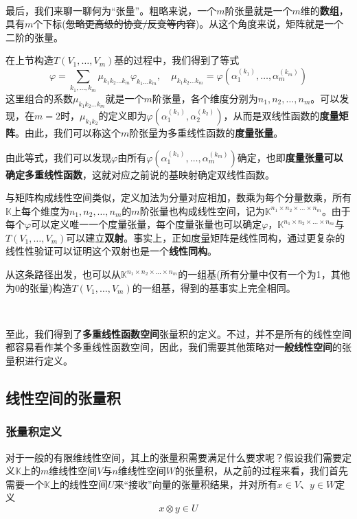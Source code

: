 \documentclass[a4paper,UTF8,fontset=windows,AutoFakeBold]{ctexart}
\newcommand*{\note}{\noindent *}
\begin{document}
\

最后，我们来聊一聊何为``张量''。粗略来说，一个$m$阶张量就是一个$m$维的\textbf{数组}，具有$m$个下标(\sout{忽略更高级的协变/反变等内容})。从这个角度来说，矩阵就是一个二阶的张量。

在上节构造$T(V_1,\dots,V_m)$基的过程中，我们得到了等式
$$\varphi=\sum_{k_1,\dots,k_m}\mu_{k_1k_2\dots k_m}\varphi_{k_1\dots k_m},\quad\mu_{k_1k_2\dots k_m}=\varphi(\alpha_1^{(k_1)},\dots,\alpha_m^{(k_m)})$$
这里组合的系数$\mu_{k_1k_2\dots k_m}$就是一个$m$阶张量，各个维度分别为$n_1,n_2,\dots,n_m$。可以发现，在$m=2$时，$\mu_{k_1k_2}$的定义即为$\varphi(\alpha_1^{(k_1)},\alpha_2^{(k_2)})$，从而是双线性函数的\textbf{度量矩阵}。由此，我们可以称这个$m$阶张量为多重线性函数的\textbf{度量张量}。

由此等式，我们可以发现$\varphi$由所有$\varphi(\alpha_1^{(k_1)},\dots,\alpha_m^{(k_m)})$确定，也即\textbf{度量张量可以确定多重线性函数}，这就对应之前说的基映射确定双线性函数。

与矩阵构成线性空间类似，定义加法为分量对应相加，数乘为每个分量数乘，所有$\mathbb{K}$上每个维度为$n_1,n_2,\dots,n_m$的$m$阶张量也构成线性空间，记为$\mathbb{K}^{n_1\times n_2\times\dots\times n_m}$。由于每个$\varphi$可以定义唯一一个度量张量，每个度量张量也可以确定$\varphi$，$\mathbb{K}^{n_1\times n_2\times\dots\times n_m}$与$T(V_1,\dots,V_m)$可以建立\textbf{双射}。事实上，正如度量矩阵是线性同构，通过更复杂的线性性验证可以证明这个双射也是一个\textbf{线性同构}。

\note 从这条路径出发，也可以从$\mathbb{K}^{n_1\times n_2\times\dots\times n_m}$的一组基(所有分量中仅有一个为1，其他为0的张量)构造$T(V_1,\dots,V_m)$的一组基，得到的基事实上完全相同。

\

至此，我们得到了\textbf{多重线性函数空间}张量积的定义。不过，并不是所有的线性空间都容易看作某个多重线性函数空间，因此，我们需要其他策略对\textbf{一般线性空间}的张量积进行定义。

\subsection{线性空间的张量积}
\subsubsection{张量积定义}
对于一般的有限维线性空间，其上的张量积需要满足什么要求呢？假设我们需要定义$\mathbb{K}$上的$m$维线性空间$V$与$n$维线性空间$W$的张量积，从之前的过程来看，我们首先需要一个$\mathbb{K}$上的线性空间$U$来``接收''向量的张量积结果，并对所有$x\in V$、$y\in W$定义
$$x\otimes y\in U$$
\end{document}
